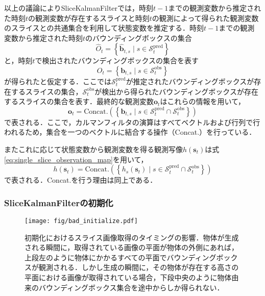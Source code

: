             以上の議論によりSliceKalmanFilterでは，時刻$t-1$までの観測変数から推定された時刻$t$の観測変数が存在するスライスと時刻$t$の観測によって得られた観測変数のスライスとの共通集合を利用して状態変数を推定する．時刻$t-1$までの観測変数から推定された時刻$t$のバウンディングボックスの集合
            \begin{equation}
                \label{eq:sliced_bounding_boxes}
                \hat{O}_t = \left\{\hat{\bm{b}}_{t, s} \mid  s \in \mathcal{S}_t^{\text{pred}}\right\}
            \end{equation}
            と，時刻$t$で検出されたバウンディングボックスの集合を表す
            \begin{equation}
                \label{eq:observed_bounding_boxes}
                O_t = \left\{\bm{b}_{t,s} \mid s \in \mathcal{S}_t^{\text{obs}}\right\}
            \end{equation}
            が得られたと仮定する．ここでは$\mathcal{S}_t^{\text{pred}}$が推定されたバウンディングボックスが存在するスライスの集合，$\mathcal{S}_t^{\text{obs}}$が検出から得られたバウンディングボックスが存在するスライスの集合を表す．最終的な観測変数$\bm{o}_t$はこれらの情報を用いて，
            \begin{equation}
                \label{eq:skf_observation}
                \bm{o}_t = \text{Concat.}\left(\left\{\bm{b}_{t,s} \mid s \in \mathcal{S}_t^{\text{pred}} \cap \mathcal{S}_t^{\text{obs}}\right\}\right)
            \end{equation}
            で表される．ここで，カルマンフィルタの演算はすべてベクトルおよび行列で行われるため，集合を一つのベクトルに結合する操作（Concat.）を行っている．
            
            またこれに応じて状態変数から観測変数を得る観測写像$h(\bm{s}_t)$は式\ref{eq:single_slice_observation_map}を用いて，
            \begin{equation}
                \label{eq:skf_observation_map}
                h(\bm{s}_t) = \text{Concat.}\left(\left\{h_s(\bm{s}_t) \mid s \in \mathcal{S}_t^{\text{pred}} \cap \mathcal{S}_t^{\text{obs}}\right\}\right)
            \end{equation}
            で表される．Concat.を行う理由は同上である．

            \subsubsection{SliceKalmanFilterの初期化}

            \begin{figure}[t]
                \centering
                \texttt{[image: fig/bad\_initialize.pdf]}
                \caption[初期化におけるスライス画像取得のタイミングの影響]{初期化におけるスライス画像取得のタイミングの影響．物体が生成される瞬間に，取得されている画像の平面が物体の外側にあれば，上段左のように物体にかかるすべての平面でバウンディングボックスが観測される．しかし生成の瞬間に，その物体が存在する高さの平面における画像が取得されている場合，下段中央のように物体由来のバウンディングボックス集合を途中からしか得られない．}
                \label{fig:bad_initialize}
            \end{figure}

